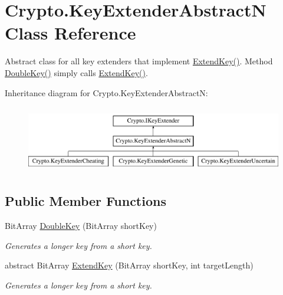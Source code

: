 \hypertarget{class_crypto_1_1_key_extender_abstract_n}{}\section{Crypto.\+Key\+Extender\+Abstract\+N Class Reference}
\label{class_crypto_1_1_key_extender_abstract_n}


Abstract class for all key extenders that implement \hyperlink{class_crypto_1_1_key_extender_abstract_n_a9df4156ad0a84730f87119e5a25cf1ef}{Extend\+Key()}. Method \hyperlink{class_crypto_1_1_key_extender_abstract_n_a57e9a8247ebde9e639c16107c2961d10}{Double\+Key()} simply calls \hyperlink{class_crypto_1_1_key_extender_abstract_n_a9df4156ad0a84730f87119e5a25cf1ef}{Extend\+Key()}.  


Inheritance diagram for Crypto.\+Key\+Extender\+Abstract\+N\+:\begin{figure}[H]
\begin{center}
\leavevmode
\includegraphics[height=2.947368cm]{class_crypto_1_1_key_extender_abstract_n}
\end{center}
\end{figure}
\subsection*{Public Member Functions}
\begin{DoxyCompactItemize}
\item 
Bit\+Array \hyperlink{class_crypto_1_1_key_extender_abstract_n_a57e9a8247ebde9e639c16107c2961d10}{Double\+Key} (Bit\+Array short\+Key)
\begin{DoxyCompactList}\small\item\em Generates a longer key from a short key. \end{DoxyCompactList}\item 
abstract Bit\+Array \hyperlink{class_crypto_1_1_key_extender_abstract_n_a9df4156ad0a84730f87119e5a25cf1ef}{Extend\+Key} (Bit\+Array short\+Key, int target\+Length)
\begin{DoxyCompactList}\small\item\em Generates a longer key from a short key. \end{DoxyCompactList}\end{DoxyCompactItemize}


